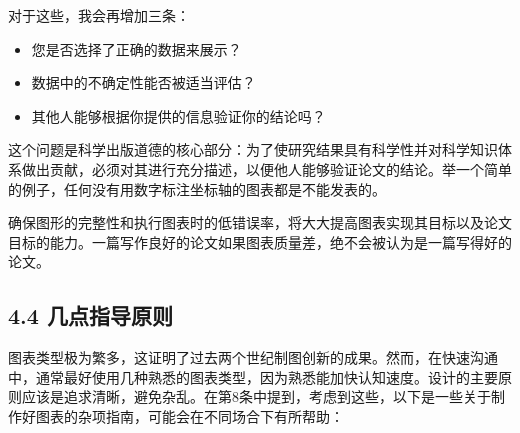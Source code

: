 对于这些，我会再增加三条：

\begin{itemize}
\item 您是否选择了正确的数据来展示？
\item 数据中的不确定性能否被适当评估？
\item 其他人能够根据你提供的信息验证你的结论吗？
\end{itemize}

这个问题是科学出版道德的核心部分：为了使研究结果具有科学性并对科学知识体系做出贡献，必须对其进行充分描述，以便他人能够验证论文的结论。举一个简单的例子，任何没有用数字标注坐标轴的图表都是不能发表的。

确保图形的完整性和执行图表时的低错误率，将大大提高图表实现其目标以及论文目标的能力。一篇写作良好的论文如果图表质量差，绝不会被认为是一篇写得好的论文。

\subsection*{4.4 几点指导原则}
图表类型极为繁多，这证明了过去两个世纪制图创新的成果。然而，在快速沟通中，通常最好使用几种熟悉的图表类型，因为熟悉能加快认知速度。设计的主要原则应该是追求清晰，避免杂乱。在第8条中提到，考虑到这些，以下是一些关于制作好图表的杂项指南，可能会在不同场合下有所帮助：


